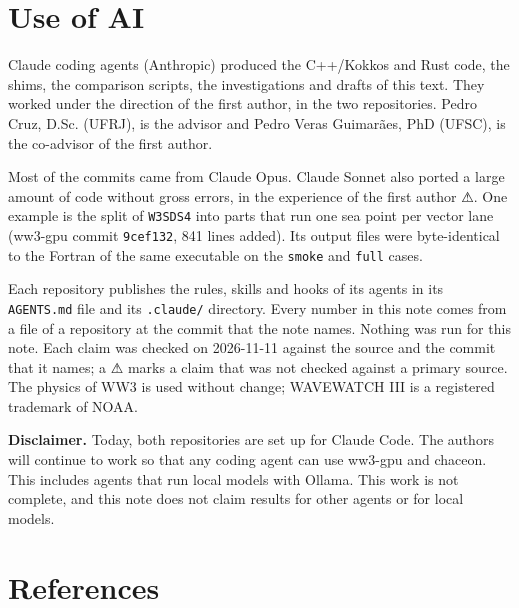 \documentclass[10pt,a4paper,]{article}
\begin{document}
\section{Use of AI}\label{sec:ai}

Claude coding agents (Anthropic) produced the C++/Kokkos and Rust code,
the shims, the comparison scripts, the investigations and drafts of this
text. They worked under the direction of the first author, in the two
repositories. Pedro Cruz, D.Sc. (UFRJ), is the advisor and Pedro Veras
Guimarães, PhD (UFSC), is the co-advisor of the first author.

Most of the commits came from Claude Opus. Claude Sonnet also ported a
large amount of code without gross errors, in the experience of the
first author ⚠. One example is the split of \texttt{W3SDS4} into parts
that run one sea point per vector lane (ww3-gpu commit \texttt{9cef132},
841 lines added). Its output files were byte-identical to the Fortran of
the same executable on the \texttt{smoke} and \texttt{full} cases.

Each repository publishes the rules, skills and hooks of its agents in
its \texttt{AGENTS.md} file and its \texttt{.claude/} directory. Every
number in this note comes from a file of a repository at the commit that
the note names. Nothing was run for this note. Each claim was checked on
2026-11-11 against the source and the commit that it names; a ⚠ marks a
claim that was not checked against a primary source. The physics of WW3
is used without change; WAVEWATCH III is a registered trademark of NOAA.

\textbf{Disclaimer.} Today, both repositories are set up for Claude
Code. The authors will continue to work so that any coding agent can use
ww3-gpu and chaceon. This includes agents that run local models with
Ollama. This work is not complete, and this note does not claim results
for other agents or for local models.

\section*{References}\label{references}
\end{document}
